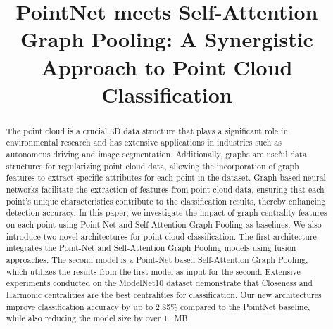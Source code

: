 \documentclass[conference]{IEEEtran}
\begin{document}
\title{PointNet meets Self-Attention Graph Pooling: A Synergistic Approach to Point Cloud Classification 
\\
}

\author{

\and
{}

\and
{}
}

\maketitle

\begin{abstract}
The point cloud is a crucial 3D data structure that plays a significant role in environmental research and has extensive 
applications in industries such as autonomous driving and image segmentation.
 Additionally, graphs are useful data structures for regularizing point cloud data,
  allowing the incorporation of graph features to extract specific attributes for each point 
  in the dataset. Graph-based neural networks facilitate the extraction of features from point
   cloud data, ensuring that each point's unique characteristics contribute to the classification 
   results, thereby enhancing detection accuracy.
In this paper, we investigate the impact of graph centrality features on each point using
 Point-Net and Self-Attention Graph Pooling as baselines. We also introduce two novel architectures 
 for point cloud classification. The first architecture integrates the Point-Net and Self-Attention Graph 
 Pooling models using fusion approaches. The second model is a Point-Net based Self-Attention Graph Pooling,
  which utilizes the results from the first model as input for the second. Extensive experiments conducted on
   the ModelNet10 dataset demonstrate that Closeness and Harmonic centralities are the best centralities for classification.
   Our new architectures improve classification accuracy by up to 2.85\% compared to the PointNet baseline, while also reducing the model size by over 1.1MB.


\end{abstract}
\end{document}
